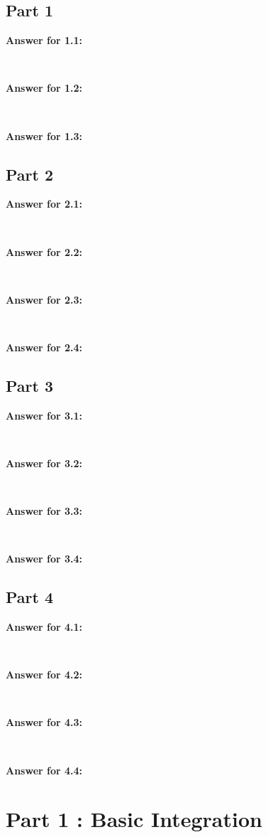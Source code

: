 \documentclass[12pt]{article}
\begin{document}
\subsection*{Part 1}
\par \textbf{Answer for 1.1: }
\par ~
\par \textbf{Answer for 1.2: }
\par ~
\par \textbf{Answer for 1.3: }

\subsection*{Part 2}
\par \textbf{Answer for 2.1: }
\par ~
\par \textbf{Answer for 2.2: }
\par ~
\par \textbf{Answer for 2.3: }
\par ~
\par \textbf{Answer for 2.4: }

\subsection*{Part 3} 
\par \textbf{Answer for 3.1: }
\par ~
\par \textbf{Answer for 3.2: }
\par ~
\par \textbf{Answer for 3.3: }
\par ~
\par \textbf{Answer for 3.4: }

\subsection*{Part 4}
\par \textbf{Answer for 4.1: }
\par ~
\par \textbf{Answer for 4.2: }
\par ~
\par \textbf{Answer for 4.3: }
\par ~
\par \textbf{Answer for 4.4: }

\newpage
\section*{Part 1 : Basic Integration}
\end{document}
